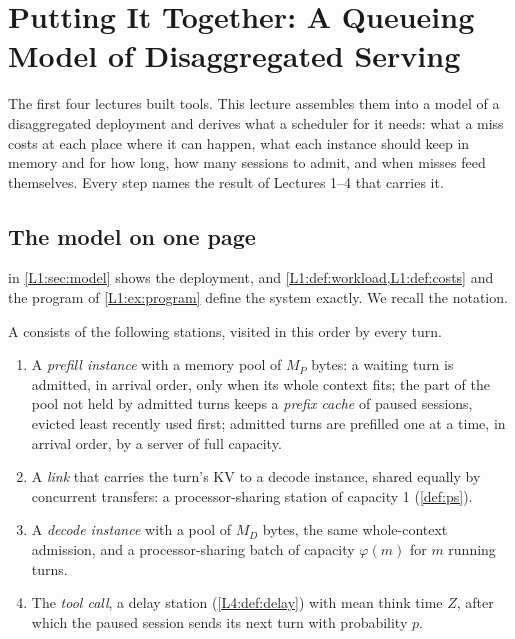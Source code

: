 \chapter{Putting It Together: A Queueing Model of Disaggregated Serving}\label{sec:L5}

The first four lectures built tools. This lecture assembles them into a model of a
disaggregated deployment and derives what a scheduler for it needs: what a miss costs
at each place where it can happen, what each instance should keep in memory and for how
long, how many sessions to admit, and when misses feed
themselves. Every step names the result of Lectures 1--4 that carries it.

\section{The model on one page}\label{L5:sec:model}

 in \cref{L1:sec:model} shows the deployment, and
\cref{L1:def:workload,L1:def:costs} and the program of \cref{L1:ex:program} define the system exactly. We
recall the notation.

\begin{definition}\label{L5:def:replica}
A  consists of the following stations, visited in this
order by every turn.
\begin{enumerate}[label=(\alph*)]
\item A \emph{prefill instance} with a memory pool of $M_P$ bytes: a waiting turn is
  admitted, in arrival order, only when its whole context fits; the part of the pool not
  held by admitted turns keeps a \emph{prefix cache} of paused sessions, evicted least
  recently used first; admitted turns are prefilled one at a time, in arrival order, by
  a server of full capacity.
\item A \emph{link} that carries the turn's KV to a decode instance, shared equally by
  concurrent transfers: a processor-sharing station of capacity 1 (\cref{def:ps}).
\item A \emph{decode instance} with a pool of $M_D$ bytes, the same whole-context
  admission, and a processor-sharing batch of capacity $\varphi(m)$ for $m$ running turns.
\item The \emph{tool call}, a delay station (\cref{L4:def:delay}) with mean think time
  $Z$, after which the paused session sends its next turn with probability $p$.
\end{enumerate}
\end{definition}

